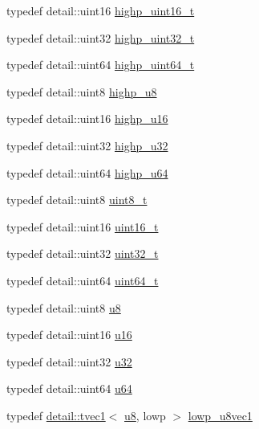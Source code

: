 \begin{DoxyCompactItemize}
\item 
typedef detail\+::uint16 \hyperlink{group__gtc__type__precision_ga3145bc0ee80432c165e985a188a722b3}{highp\+\_\+uint16\+\_\+t}
\item 
typedef detail\+::uint32 \hyperlink{group__gtc__type__precision_ga8eb85ad460079c63b68866ae34637bda}{highp\+\_\+uint32\+\_\+t}
\item 
typedef detail\+::uint64 \hyperlink{group__gtc__type__precision_ga6e66f40c5909bfc872b068187fa6029e}{highp\+\_\+uint64\+\_\+t}
\item 
typedef detail\+::uint8 \hyperlink{group__gtc__type__precision_ga8a60abe782749c504fb5ae51eb8b49cc}{highp\+\_\+u8}
\item 
typedef detail\+::uint16 \hyperlink{group__gtc__type__precision_ga9da2178d7501d9c0f225fa1a7b70cb45}{highp\+\_\+u16}
\item 
typedef detail\+::uint32 \hyperlink{group__gtc__type__precision_gae8e8a2c712653891a03c171795286ac5}{highp\+\_\+u32}
\item 
typedef detail\+::uint64 \hyperlink{group__gtc__type__precision_ga6006ea883d3c0491791650b2fb84de39}{highp\+\_\+u64}
\item 
typedef detail\+::uint8 \hyperlink{group__gtc__type__precision_ga93adf6dd9803408f3e3aaf9dedda352b}{uint8\+\_\+t}
\item 
typedef detail\+::uint16 \hyperlink{group__gtc__type__precision_gac4eb4f43cae8129b00086dc234d3b8fc}{uint16\+\_\+t}
\item 
typedef detail\+::uint32 \hyperlink{group__gtc__type__precision_ga822ca53a9ad412504532838906276a99}{uint32\+\_\+t}
\item 
typedef detail\+::uint64 \hyperlink{group__gtc__type__precision_ga058f57c19e1befdcf12498944bd73e69}{uint64\+\_\+t}
\item 
typedef detail\+::uint8 \hyperlink{group__gtc__type__precision_ga5e3dc67373d5068997d2d9f41c9024d2}{u8}
\item 
typedef detail\+::uint16 \hyperlink{group__gtc__type__precision_gae7a1571503f83d2264ddfa705a6b082a}{u16}
\item 
typedef detail\+::uint32 \hyperlink{group__gtc__type__precision_ga54e837745059fd29017bed71cfa0a8db}{u32}
\item 
typedef detail\+::uint64 \hyperlink{group__gtc__type__precision_ga71cedd4972f9cb1a5e14dfe5ab83ecd7}{u64}
\item 
typedef \hyperlink{structglm_1_1detail_1_1tvec1}{detail\+::tvec1}$<$ \hyperlink{group__gtc__type__precision_ga5e3dc67373d5068997d2d9f41c9024d2}{u8}, lowp $>$ \hyperlink{group__gtc__type__precision_gaee3cba2c93fa8cb7295671908995197c}{lowp\+\_\+u8vec1}

\end{DoxyCompactItemize}
